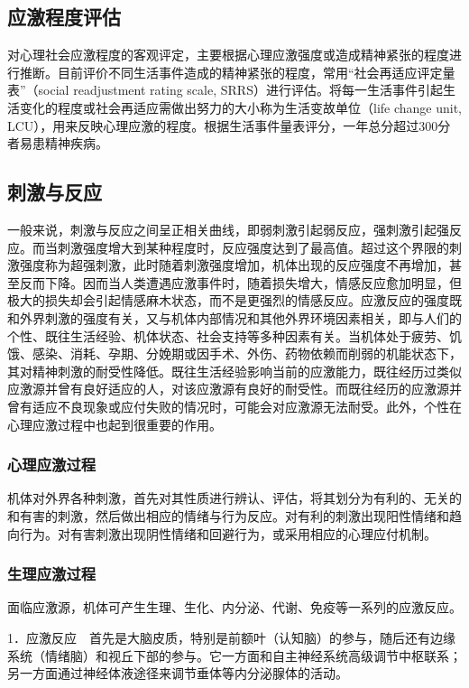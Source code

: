\subsection{应激程度评估}

对心理社会应激程度的客观评定，主要根据心理应激强度或造成精神紧张的程度进行推断。目前评价不同生活事件造成的精神紧张的程度，常用“社会再适应评定量表”（social
readjustment rating scale,
SRRS）进行评估。将每一生活事件引起生活变化的程度或社会再适应需做出努力的大小称为生活变故单位（life
change unit,
LCU），用来反映心理应激的程度。根据生活事件量表评分，一年总分超过300分者易患精神疾病。

\subsection{刺激与反应}

一般来说，刺激与反应之间呈正相关曲线，即弱刺激引起弱反应，强刺激引起强反应。而当刺激强度增大到某种程度时，反应强度达到了最高值。超过这个界限的刺激强度称为超强刺激，此时随着刺激强度增加，机体出现的反应强度不再增加，甚至反而下降。因而当人类遭遇应激事件时，随着损失增大，情感反应愈加明显，但极大的损失却会引起情感麻木状态，而不是更强烈的情感反应。应激反应的强度既和外界刺激的强度有关，又与机体内部情况和其他外界环境因素相关，即与人们的个性、既往生活经验、机体状态、社会支持等多种因素有关。当机体处于疲劳、饥饿、感染、消耗、孕期、分娩期或因手术、外伤、药物依赖而削弱的机能状态下，其对精神刺激的耐受性降低。既往生活经验影响当前的应激能力，既往经历过类似应激源并曾有良好适应的人，对该应激源有良好的耐受性。而既往经历的应激源并曾有适应不良现象或应付失败的情况时，可能会对应激源无法耐受。此外，个性在心理应激过程中也起到很重要的作用。

\subsubsection{心理应激过程}

机体对外界各种刺激，首先对其性质进行辨认、评估，将其划分为有利的、无关的和有害的刺激，然后做出相应的情绪与行为反应。对有利的刺激出现阳性情绪和趋向行为。对有害刺激出现阴性情绪和回避行为，或采用相应的心理应付机制。

\subsubsection{生理应激过程}

面临应激源，机体可产生生理、生化、内分泌、代谢、免疫等一系列的应激反应。

1．应激反应　首先是大脑皮质，特别是前额叶（认知脑）的参与，随后还有边缘系统（情绪脑）和视丘下部的参与。它一方面和自主神经系统高级调节中枢联系；另一方面通过神经体液途径来调节垂体等内分泌腺体的活动。


